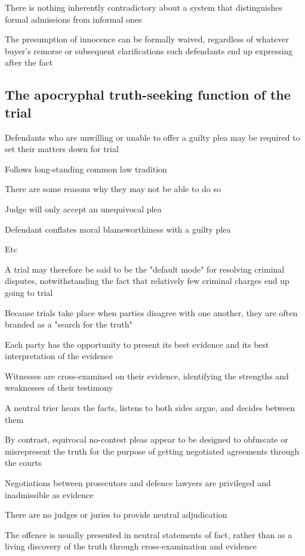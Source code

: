 There is nothing inherently contradictory about a system that distinguishes formal admissions from informal ones

The presumption of innocence can be formally waived, regardless of whatever buyer's remorse or subsequent clarifications such defendants end up expressing after the fact

\subsection{The apocryphal truth-seeking function of the trial}

Defendants who are unwilling or unable to offer a guilty plea may be required to set their matters down for trial

Follows long-standing common law tradition

There are some reasons why they may not be able to do so

Judge will only accept an unequivocal plea

Defendant conflates moral blameworthiness with a guilty plea

Etc

A trial may therefore be said to be the "default mode" for resolving criminal disputes, notwithstanding the fact that relatively few criminal charges end up going to trial

Because trials take place when parties disagree with one another, they are often branded as a "search for the truth"

Each party has the opportunity to present its best evidence and its best interpretation of the evidence

Witnesses are cross-examined on their evidence, identifying the strengths and weaknesses of their testimony

A neutral trier hears the facts, listens to both sides argue, and decides between them

By contrast, equivocal no-contest pleas appear to be designed to obfuscate or misrepresent the truth for the purpose of getting negotiated agreements through the courts

Negotiations between prosecutors and defence lawyers are privileged and inadmissible as evidence

There are no judges or juries to provide neutral adjudication

The offence is usually presented in neutral statements of fact, rather than as a living discovery of the truth through cross-examination and evidence

